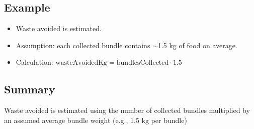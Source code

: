 \documentclass[12pt]{article}
\begin{document}
\subsection{Example}

\begin{framed}
\begin{itemize}
    \item Waste avoided is estimated.
    \item Assumption: each collected bundle contains $\sim$1.5 kg of food on average.
    \item Calculation: \( \text{wasteAvoidedKg} = \text{bundlesCollected} \cdot 1.5 \)
\end{itemize}
\end{framed}






\subsection{Summary}
Waste avoided is estimated using the number of collected bundles multiplied by an assumed average bundle weight (e.g., 1.5 kg per bundle)
\end{document}
